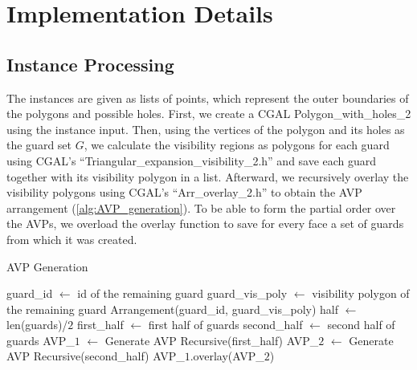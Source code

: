 \chapter{Implementation Details}\label{ch:implementation_details}

\section{Instance Processing}
The instances are given as lists of points, which represent the outer boundaries of the polygons and possible holes. First, we create a CGAL Polygon\_with\_holes\_2 using the instance input. Then, using the vertices of the polygon and its holes as the guard set $G$, we calculate the visibility regions as polygons for each guard using CGAL's ``Triangular\_expansion\_visibility\_2.h'' and save each guard together with its visibility polygon in a list. Afterward, we recursively overlay the visibility polygons using CGAL's ``Arr\_overlay\_2.h'' to obtain the AVP arrangement (\cref{alg:AVP_generation}). To be able to form the partial order over the AVPs, we overload the overlay function to save for every face a set of guards from which it was created. 

\begin{algorithm}
\caption{AVP Generation}\label{alg:AVP_generation}
\fontsize{10}{12}\selectfont
\begin{algorithmic} 
    \State guard\_id $\gets$ id of the remaining guard
    \State guard\_vis\_poly $\gets$ visibility polygon of the remaining guard
    \State \Return Arrangement(guard\_id, guard\_vis\_poly)
\Else
    \State half $\gets$ len(guards)/$2$
    \State first\_half $\gets$ first half of guards
    \State second\_half $\gets$ second half of guards
    \State AVP\_$1$ $\gets$ Generate AVP Recursive(first\_half)
    \State AVP\_$2$ $\gets$ Generate AVP Recursive(second\_half)
    \State \Return AVP\_$1$.overlay(AVP\_$2$)
\EndIf
\EndProcedure
\end{algorithmic}
\end{algorithm}

